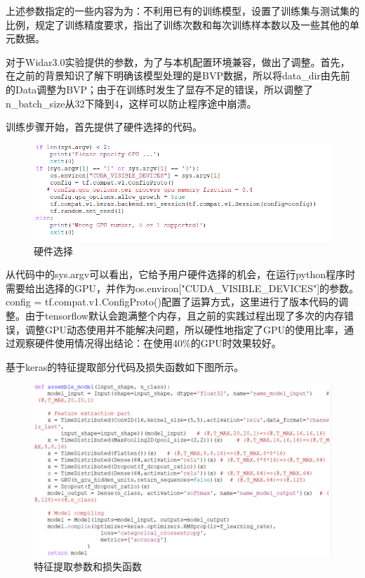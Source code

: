 \documentclass[a4paper]{article}
\begin{document}
  上述参数指定的一些内容为为：不利用已有的训练模型，设置了训练集与测试集的比例，规定了训练精度要求，指出了训练次数和每次训练样本数以及一些其他的单元数据。 \par           
  对于Widar3.0实验提供的参数，为了与本机配置环境兼容，做出了调整。首先，在之前的背景知识了解下明确该模型处理的是BVP数据，所以将data\_dir由先前的Data调整为BVP；由于在训练时发生了显存不足的错误，所以调整了n\_batch\_size从32下降到4，这样可以防止程序途中崩溃。\par
  训练步骤开始，首先提供了硬件选择的代码。 \par
                \begin{figure}[H]
                \centering
                \includegraphics[width=12cm]{images/begin.png}
                \caption{硬件选择}
                \label{fig1}
              \end{figure}
  从代码中的sys.argv可以看出，它给予用户硬件选择的机会，在运行python程序时需要给出选择的GPU，并作为os.environ["CUDA\_VISIBLE\_DEVICES"]的参数。config = tf.compat.v1.ConfigProto()配置了运算方式，这里进行了版本代码的调整。由于tensorflow默认会跑满整个内存，且之前的实践过程出现了多次的内存错误，调整GPU动态使用并不能解决问题，所以硬性地指定了GPU的使用比率，通过观察硬件使用情况得出结论：在使用40\%的GPU时效果较好。 \par
  基于keras的特征提取部分代码及损失函数如下图所示。 \par
                \begin{figure}[H]
                \centering
                \includegraphics[width=12cm]{images/model.png}
                \caption{特征提取参数和损失函数}
                \label{fig1}
              \end{figure}
\end{document}
